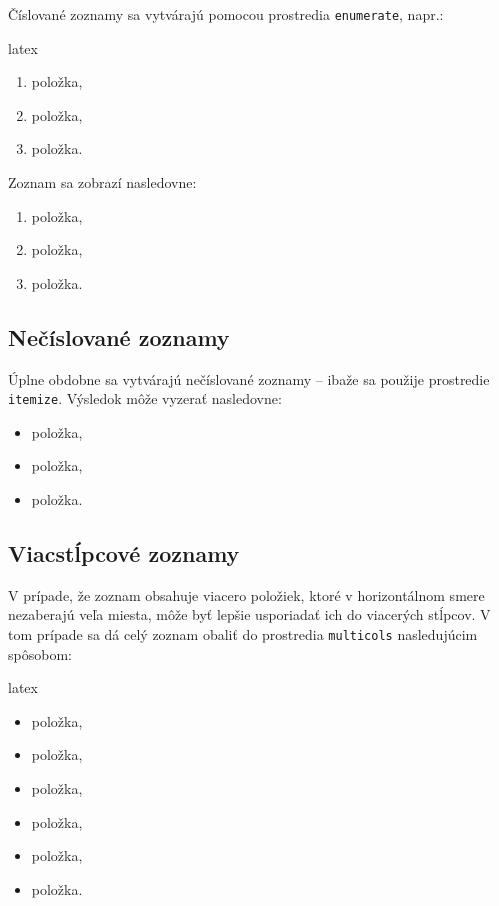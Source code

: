 Číslované zoznamy sa vytvárajú pomocou prostredia \texttt{enumerate}, napr.:
\begin{inlinecode}{latex}
\begin{enumerate}
\item položka,
\item položka,
\item položka.
\end{enumerate}
\end{inlinecode}

Zoznam sa zobrazí nasledovne:
\begin{enumerate}
\item položka,
\item položka,
\item položka.
\end{enumerate}

\subsection{Nečíslované zoznamy}

Úplne obdobne sa vytvárajú nečíslované zoznamy -- ibaže sa použije prostredie \texttt{itemize}. Výsledok môže vyzerať nasledovne:
\begin{itemize}
\item položka,
\item položka,
\item položka.
\end{itemize}

\subsection{Viacstĺpcové zoznamy}

V prípade, že zoznam obsahuje viacero položiek, ktoré v horizontálnom smere nezaberajú veľa miesta, môže byť lepšie usporiadať ich do viacerých stĺpcov. V tom prípade sa dá celý zoznam obaliť do prostredia \texttt{multicols} nasledujúcim spôsobom:
\begin{inlinecode}{latex}
\begin{multicols}{2}
\begin{itemize}
\item položka,
\item položka,
\item položka,
\item položka,
\item položka,
\item položka.
\end{itemize}
\end{multicols}
\end{inlinecode}


